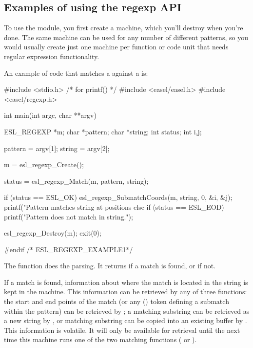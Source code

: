 \subsection{Examples of using the regexp API}

To use the  module, you first create a machine, which
you'll destroy when you're done. The same machine can be used for any
number of different patterns, so you would usually create just one
machine per function or code unit that needs regular expression
functionality.

An example of code that matches a  against a
 is:

\begin{cchunk}
#include <stdio.h> /* for printf() */
#include <easel/easel.h>
#include <easel/regexp.h>

int
main(int argc, char **argv)
{
  ESL_REGEXP *m;  
  char       *pattern;
  char       *string;
  int         status;
  int         i,j;

  pattern = argv[1];
  string  = argv[2];

  m = esl_regexp_Create();

  status = esl_regexp_Match(m, pattern, string);

  if (status == ESL_OK) 
    {
      esl_regexp_SubmatchCoords(m, string, 0, &i, &j);
      printf("Pattern matches string at positions %
    }
  else if (status == ESL_EOD)
    {
      printf("Pattern does not match in string\n.");
    }

  esl_regexp_Destroy(m);
  exit(0);
}
#endif /* ESL_REGEXP_EXAMPLE1*/
\end{cchunk}


The  function does the parsing. It returns
 if a match is found, or  if not. 

If a match is found, information about where the match is located in
the string is kept in the machine. This information can be retrieved
by any of three functions: the start and end points of the match (or
any () token defining a submatch within the pattern) can be retrieved
by ; a matching substring can be
retrieved as a new string by , or
matching substring can be copied into an existing buffer by
. This information is volatile. It
will only be available for retrieval until the next time this machine
runs one of the two matching functions ( or
).

